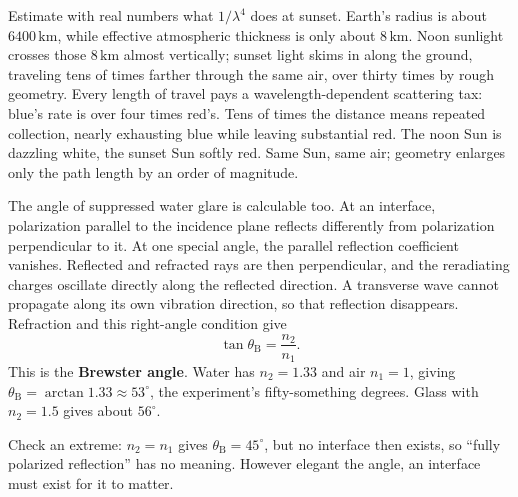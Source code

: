 Estimate with real numbers what \(1/\lambda^4\) does at sunset. Earth's radius is about \(6400\,\mathrm{km}\), while effective atmospheric thickness is only about \(8\,\mathrm{km}\). Noon sunlight crosses those \(8\,\mathrm{km}\) almost vertically; sunset light skims in along the ground, traveling tens of times farther through the same air, over thirty times by rough geometry. Every length of travel pays a wavelength-dependent scattering tax: blue's rate is over four times red's. Tens of times the distance means repeated collection, nearly exhausting blue while leaving substantial red. The noon Sun is dazzling white, the sunset Sun softly red. Same Sun, same air; geometry enlarges only the path length by an order of magnitude.

\begin{mathbridge}
The angle of suppressed water glare is calculable too. At an interface, polarization parallel to the incidence plane reflects differently from polarization perpendicular to it. At one special angle, the parallel reflection coefficient vanishes. Reflected and refracted rays are then perpendicular, and the reradiating charges oscillate directly along the reflected direction. A transverse wave cannot propagate along its own vibration direction, so that reflection disappears. Refraction and this right-angle condition give
\[
  \tan\theta_{\mathrm B} = \frac{n_2}{n_1}.
\]
This is the \textbf{Brewster angle}. Water has \(n_2=1.33\) and air \(n_1=1\), giving \(\theta_{\mathrm B}=\arctan 1.33\approx 53^\circ\), the experiment's fifty-something degrees. Glass with \(n_2=1.5\) gives about \(56^\circ\).

\begin{center}
\end{center}

Check an extreme: \(n_2=n_1\) gives \(\theta_{\mathrm B}=45^\circ\), but no interface then exists, so ``fully polarized reflection'' has no meaning. However elegant the angle, an interface must exist for it to matter.
\end{mathbridge}

